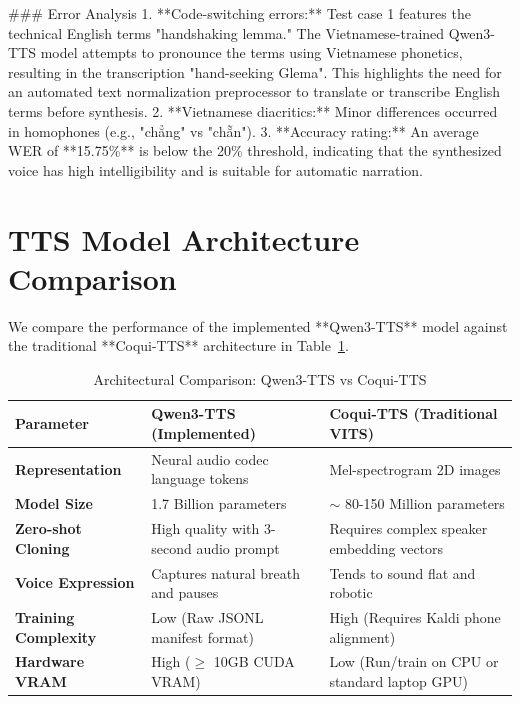 \documentclass[a4paper,12pt]{report}
\begin{document}
### Error Analysis
1. **Code-switching errors:** Test case 1 features the technical English terms "handshaking lemma." The Vietnamese-trained Qwen3-TTS model attempts to pronounce the terms using Vietnamese phonetics, resulting in the transcription "hand-seeking Glema". This highlights the need for an automated text normalization preprocessor to translate or transcribe English terms before synthesis.
2. **Vietnamese diacritics:** Minor differences occurred in homophones (e.g., "chẳng" vs "chẵn").
3. **Accuracy rating:** An average WER of **15.75\%** is below the 20\% threshold, indicating that the synthesized voice has high intelligibility and is suitable for automatic narration.

\section{TTS Model Architecture Comparison}
We compare the performance of the implemented **Qwen3-TTS** model against the traditional **Coqui-TTS** architecture in Table~\ref{tab:tts_comparison}.

\begin{table}[h!]
\centering
\small
\begin{tabular}{p{3.5cm}p{5.5cm}p{5.5cm}}
\toprule
\textbf{Parameter} & \textbf{Qwen3-TTS (Implemented)} & \textbf{Coqui-TTS (Traditional VITS)} \\
\midrule
\textbf{Representation} & Neural audio codec language tokens & Mel-spectrogram 2D images \\
\textbf{Model Size} & 1.7 Billion parameters & $\sim$ 80-150 Million parameters \\
\textbf{Zero-shot Cloning} & High quality with 3-second audio prompt & Requires complex speaker embedding vectors \\
\textbf{Voice Expression} & Captures natural breath and pauses & Tends to sound flat and robotic \\
\textbf{Training Complexity} & Low (Raw JSONL manifest format) & High (Requires Kaldi phone alignment) \\
\textbf{Hardware VRAM} & High ($\ge$ 10GB CUDA VRAM) & Low (Run/train on CPU or standard laptop GPU) \\
\bottomrule
\end{tabular}
\caption{Architectural Comparison: Qwen3-TTS vs Coqui-TTS}
\label{tab:tts_comparison}
\end{table}

\newpage

\end{document}
